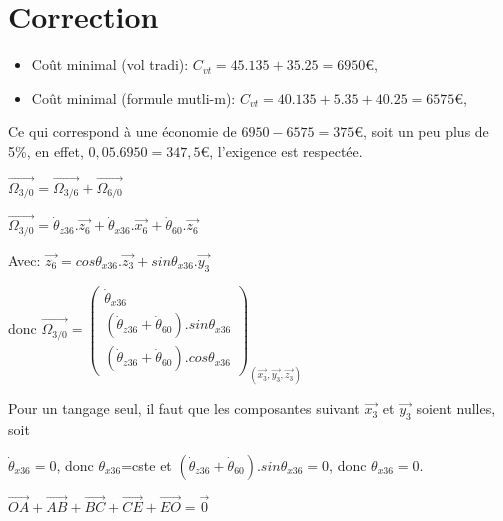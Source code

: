 \ifdef{\public}{}{}

\newpage
\cleardoublepage

\pagestyle{correction}

\setcounter{equation}{0}

\section{Correction}

\cor

\begin{itemize}
 \item Coût minimal (vol tradi): $C_{vt}=45.135+35.25=6950\euro$,
 \item Coût minimal (formule mutli-m): $C_{vt}=40.135+5.35+40.25=6575\euro$,
\end{itemize}

Ce qui correspond à une économie de $6950-6575=375\euro$, soit un peu plus de 5\%, en effet, $0,05.6950=347,5\euro$, l'exigence est respectée.

\cor

$\overrightarrow{\Omega_{3/0}}=\overrightarrow{\Omega_{3/6}}+\overrightarrow{\Omega_{6/0}}$

$\overrightarrow{\Omega_{3/0}}=\dot{\theta}_{z36}.\overrightarrow{z_6}+\dot{\theta}_{x36}.\overrightarrow{x_6}+\dot{\theta}_{60}.\overrightarrow{z_6}$

Avec: $\overrightarrow{z_6}=cos\theta_{x36}.\overrightarrow{z_3}+sin\theta_{x36}.\overrightarrow{y_3}$

donc $\overrightarrow{\Omega_{3/0}}=\left(\begin{array}{c}\dot{\theta}_{x36}\\ (\dot{\theta}_{z36}+\dot{\theta}_{60}).sin\theta_{x36} \\ (\dot{\theta}_{z36}+\dot{\theta}_{60}).cos\theta_{x36} \end{array}\right)_{(\overrightarrow{x_3},\overrightarrow{y_3},\overrightarrow{z_3})}$

\cor

Pour un tangage seul, il faut que les composantes suivant $\overrightarrow{x_3}$ et $\overrightarrow{y_3}$ soient nulles, soit 

$\dot{\theta}_{x36}=0$, donc $\theta_{x36}$=cste et $(\dot{\theta}_{z36}+\dot{\theta}_{60}).sin\theta_{x36}=0$, donc $\theta_{x36}=0$.

\cor

$\overrightarrow{OA}+\overrightarrow{AB}+\overrightarrow{BC}+\overrightarrow{CE}+\overrightarrow{EO}=\overrightarrow{0}$

